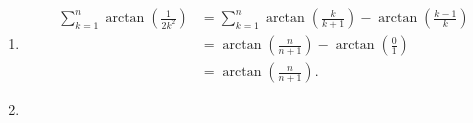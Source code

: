 \begin{correction}
\begin{enumerate}


\item \begin{align*}
\sum_{k=1}^n \arctan\left(\frac{1}{2k^2}\right)&=\sum_{k=1}^n  \arctan\left(\frac{k}{k+1}\right)-\arctan\left(\frac{k-1}{k}\right)\\
&=\arctan(\frac{n}{n+1}) - \arctan(\frac{0}{1})\\
&=\arctan(\frac{n}{n+1}).
\end{align*}

\item {}
\end{enumerate}




\end{correction}